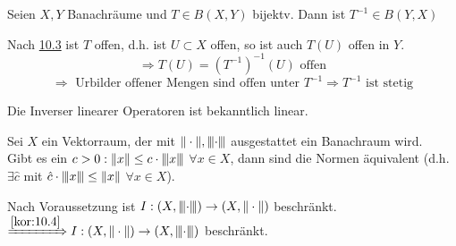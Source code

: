 \begin{kor} \label{kor:10.4}
	Seien $X, Y$ Banachräume und $T \in B(X, Y)$ bijektv. Dann ist $T^{-1} \in B(Y, X)$	
\end{kor}

\begin{beweis}
	Nach \hyperref[satz:10.3-offeneAbbildung]{10.3} ist $T$ offen, d.h. ist $U \subset X$ offen, so ist auch $T(U)$ offen in $Y$. \\
	\[ \Rightarrow T(U) = \left( T^{-1} \right)^{-1}(U) \text{ offen} \]
	\[ \Rightarrow \text{ Urbilder offener Mengen sind offen unter } T^{-1} \Rightarrow T^{-1} \text{ ist stetig} \] 
	
	Die Inverser linearer Operatoren ist bekanntlich linear.	
\end{beweis}


\begin{kor} \label{kor:10.5}
	Sei $X$	ein Vektorraum, der mit $\| \cdot \|, {\left\vert\kern-0.25ex\left\vert\kern-0.25ex\left\vert\cdot\right\vert\kern-0.25ex\right\vert\kern-0.25ex\right\vert}$ ausgestattet ein Banachraum wird. \\
	Gibt es ein $c > 0: \| x \| \leq c \cdot {\left\vert\kern-0.25ex\left\vert\kern-0.25ex\left\vert x\right\vert\kern-0.25ex\right\vert\kern-0.25ex\right\vert}$ $\forall x \in X$, dann sind die Normen äquivalent (d.h. $\exists \hat{c} $ mit $\hat{c} \cdot {\left\vert\kern-0.25ex\left\vert\kern-0.25ex\left\vert x\right\vert\kern-0.25ex\right\vert\kern-0.25ex\right\vert} \leq \| x \|$ $\forall x \in X$). 
\end{kor}

\begin{beweis}
	Nach Voraussetzung ist $I : (X, {\left\vert\kern-0.25ex\left\vert\kern-0.25ex\left\vert\cdot\right\vert\kern-0.25ex\right\vert\kern-0.25ex\right\vert}) \rightarrow (X, \| \cdot \|)$ beschränkt. \\
	$\xRightarrow[]{\ref{kor:10.4}} I : (X, \| \cdot \|) \rightarrow (X, {\left\vert\kern-0.25ex\left\vert\kern-0.25ex\left\vert\cdot\right\vert\kern-0.25ex\right\vert\kern-0.25ex\right\vert})$ beschränkt.
\end{beweis}



\newpage